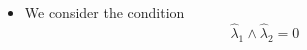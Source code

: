 \documentclass[aps,preprint]{revtex4}%
\begin{document}
\begin{itemize}
\begin{align}
&  \left\vert \psi_{1}\psi_{2}\right\rangle \left\langle \psi_{1}\psi
_{2}\right\vert ,\left\vert \psi_{1}\psi_{3}\right\rangle \left\langle
\psi_{1}\psi_{3}\right\vert ,\left\vert \psi_{1}\psi_{4}\right\rangle
\left\langle \psi_{1}\psi_{4}\right\vert ,\left\vert \psi_{2}\psi
_{3}\right\rangle \left\langle \psi_{2}\psi_{3}\right\vert ,\left\vert
\psi_{2}\psi_{4}\right\rangle \left\langle \psi_{2}\psi_{4}\right\vert
,\left\vert \psi_{3}\psi_{4}\right\rangle \left\langle \psi_{3}\psi
_{4}\right\vert ,\nonumber\\
&  \frac{i}{\sqrt{2}}\left(  \left\vert \psi_{1}\psi_{3}\right\rangle
\left\langle \psi_{2}\psi_{4}\right\vert -\left\vert \psi_{2}\psi
_{4}\right\rangle \left\langle \psi_{1}\psi_{3}\right\vert \right)  ,\frac
{i}{\sqrt{2}}\left(  \left\vert \psi_{3}\psi_{4}\right\rangle \left\langle
\psi_{1}\psi_{2}\right\vert -\left\vert \psi_{1}\psi_{2}\right\rangle
\left\langle \psi_{3}\psi_{4}\right\vert \right) \nonumber\\
&  \frac{i}{\sqrt{2}}\left(  \left\vert \psi_{2}\psi_{3}\right\rangle
\left\langle \psi_{1}\psi_{4}\right\vert -\left\vert \psi_{1}\psi
_{4}\right\rangle \left\langle \psi_{2}\psi_{3}\right\vert \right)  .
\end{align}


\item We consider the condition
\begin{equation}
\hat{\lambda}_{1}\wedge\hat{\lambda}_{2}=0
\end{equation}



\end{itemize}
\end{document}
